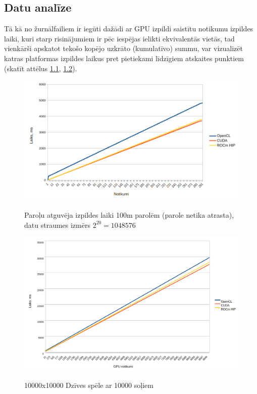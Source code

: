 \begin{center}
    \chapter{Datu analīze}
\end{center}

Tā kā no žurnālfailiem ir iegūti dažādi ar GPU izpildi saistītu notikumu
izpildes laiki, kuri starp risinājumiem ir pēc iespējas ielikti ekvivalentās
vietās, tad vienkārši apskatot tekošo kopējo uzkrāto (kumulatīvo) summu,
var vizualizēt katras platformas izpildes laikus pret pietiekami
līdzīgiem atskaites punktiem (skatīt attēlus \ref{img:sha256_100m_not_found_cum},
\ref{img:gol_10k10k_10k_steps_cum}).

\begin{figure}[h]
    \caption{Paroļu atguvēja izpildes laiki 100m parolēm (parole netika
    atrasta), datu straumes izmērs \( 2^{20} = 1048576\)}

    \includegraphics[width=\textwidth]{images/sha256_100m_not_found.png}
    \label{img:sha256_100m_not_found_cum}
\end{figure}

\begin{figure}[h]
    \caption{10000x10000 Dzīves spēle ar 10000 soļiem}
    \includegraphics[width=\textwidth]{images/gol_10k_by_10k_10ksteps.png}
    \label{img:gol_10k10k_10k_steps_cum}
\end{figure}

